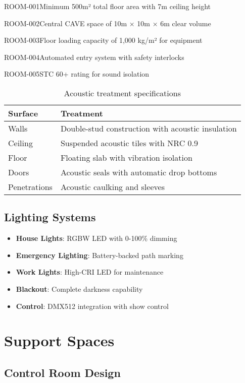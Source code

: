 \begin{requirement}{ROOM-001}{Minimum 500m² total floor area with 7m ceiling height}
\begin{requirement}{ROOM-002}{Central CAVE space of 10m × 10m × 6m clear volume}
\begin{requirement}{ROOM-003}{Floor loading capacity of 1,000 kg/m² for equipment}
\begin{requirement}{ROOM-004}{Automated entry system with safety interlocks}
\begin{requirement}{ROOM-005}{STC 60+ rating for sound isolation}
\begin{table}[H]
\centering
\begin{tabularx}{\textwidth}{@{}lX@{}}
\toprule
\textbf{Surface} & \textbf{Treatment} \\
\midrule
Walls & Double-stud construction with acoustic insulation \\
Ceiling & Suspended acoustic tiles with NRC 0.9 \\
Floor & Floating slab with vibration isolation \\
Doors & Acoustic seals with automatic drop bottoms \\
Penetrations & Acoustic caulking and sleeves \\
\bottomrule
\end{tabularx}
\caption{Acoustic treatment specifications}
\end{table}

\subsection{Lighting Systems}

\begin{itemize}
    \item \textbf{House Lights}: RGBW LED with 0-100\% dimming
    \item \textbf{Emergency Lighting}: Battery-backed path marking
    \item \textbf{Work Lights}: High-CRI LED for maintenance
    \item \textbf{Blackout}: Complete darkness capability
    \item \textbf{Control}: DMX512 integration with show control
\end{itemize}

\section{Support Spaces}

\subsection{Control Room Design}

\begin{figure}[H]
\centering
{}
\end{figure}
\end{requirement}
\end{requirement}
\end{requirement}
\end{requirement}
\end{requirement}
